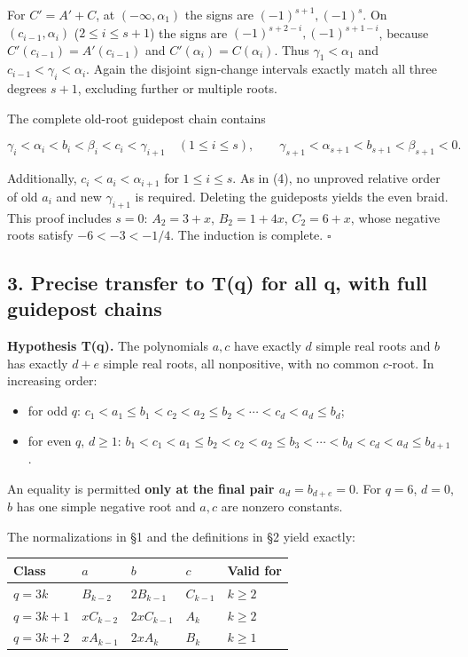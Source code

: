 \documentclass[
  10pt,
]{article}
\providecommand{\tightlist}{%
  \setlength{\itemsep}{0pt}\setlength{\parskip}{0pt}}
\begin{document}
For \(C'=A'+C\), at \((-\infty,\alpha_1)\) the signs are
\((-1)^{s+1},(-1)^s\). On \((c_{i-1},\alpha_i)\) (\(2\le i\le s+1\)) the
signs are \((-1)^{s+2-i},(-1)^{s+1-i}\), because
\(C'(c_{i-1})=A'(c_{i-1})\) and \(C'(\alpha_i)=C(\alpha_i)\). Thus
\(\gamma_1<\alpha_1\) and \(c_{i-1}<\gamma_i<\alpha_i\). Again the
disjoint sign-change intervals exactly match all three degrees \(s+1\),
excluding further or multiple roots.

The complete old-root guidepost chain contains

\[
 \gamma_i<\alpha_i<b_i<\beta_i<c_i<\gamma_{i+1}\quad (1\le i\le s),\qquad
 \gamma_{s+1}<\alpha_{s+1}<b_{s+1}<\beta_{s+1}<0.\tag{5}
\]

Additionally, \(c_i<a_i<\alpha_{i+1}\) for \(1\le i\le s\). As in (4),
no unproved relative order of old \(a_i\) and new \(\gamma_{i+1}\) is
required. Deleting the guideposts yields the even braid. This proof
includes \(s=0\): \(A_2=3+x\), \(B_2=1+4x\), \(C_2=6+x\), whose negative
roots satisfy \(-6<-3<-1/4\). The induction is complete. \(\square\)

\subsection{3. Precise transfer to T(q) for all q, with full guidepost
chains}\label{precise-transfer-to-tq-for-all-q-with-full-guidepost-chains}

\textbf{Hypothesis T(q).} The polynomials \(a,c\) have exactly \(d\)
simple real roots and \(b\) has exactly \(d+e\) simple real roots, all
nonpositive, with no common \(c\)-root. In increasing order:

\begin{itemize}
\tightlist
\item
  for odd \(q\):
  \(c_1<a_1\le b_1<c_2<a_2\le b_2<\cdots<c_d<a_d\le b_d\);
\item
  for even \(q\), \(d\ge1\):
  \(b_1<c_1<a_1\le b_2<c_2<a_2\le b_3<\cdots<b_d<c_d<a_d\le b_{d+1}\).
\end{itemize}

An equality is permitted \textbf{only at the final pair
\(a_d=b_{d+e}=0\)}. For \(q=6\), \(d=0\), \(b\) has one simple negative
root and \(a,c\) are nonzero constants.

The normalizations in §1 and the definitions in §2 yield exactly:

\begin{longtable}[]{@{}lllll@{}}
\toprule\noalign{}
Class & \(a\) & \(b\) & \(c\) & Valid for \\
\midrule\noalign{}
\endhead
\bottomrule\noalign{}
\endlastfoot
\(q=3k\) & \(B_{k-2}\) & \(2B_{k-1}\) & \(C_{k-1}\) & \(k\ge2\) \\
\(q=3k+1\) & \(xC_{k-2}\) & \(2xC_{k-1}\) & \(A_k\) & \(k\ge2\) \\
\(q=3k+2\) & \(xA_{k-1}\) & \(2xA_k\) & \(B_k\) & \(k\ge1\) \\
\end{longtable}
\end{document}
